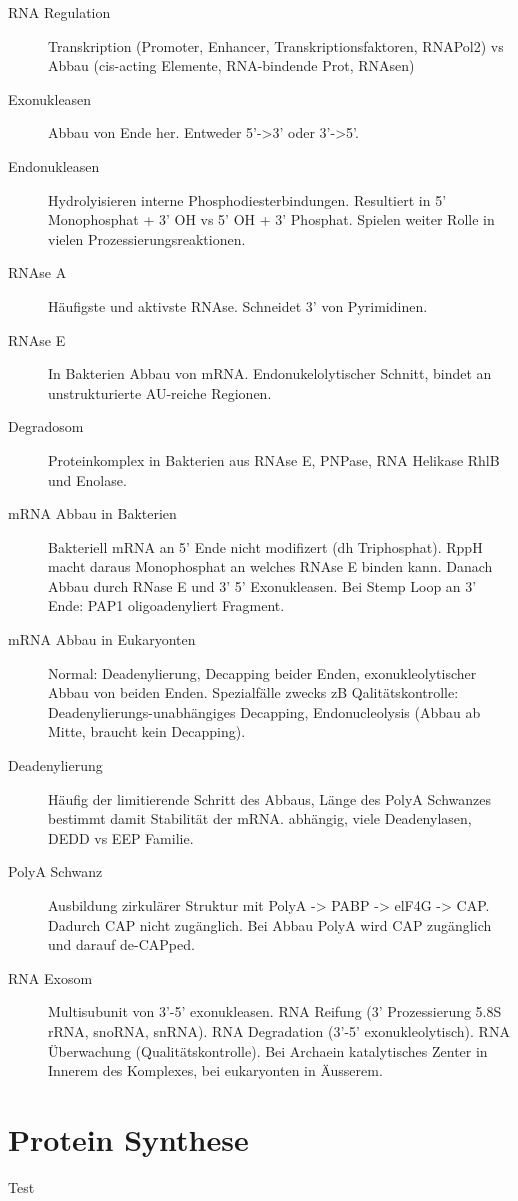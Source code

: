 \documentclass[a4paper,twocolumn,usegeometry,english,fontsize=6,DIV=16]{scrartcl}
\begin{document}
\begin{description}
	\item[RNA Regulation] Transkription (Promoter, Enhancer,
		Transkriptionsfaktoren, RNAPol2) vs Abbau (cis-acting Elemente,
		RNA-bindende Prot, RNAsen)
	\item[Exonukleasen] Abbau von Ende her. Entweder 5'->3' oder 3'->5'.
	\item[Endonukleasen] Hydrolyisieren interne Phosphodiesterbindungen.
		Resultiert in 5' Monophosphat + 3' OH vs 5' OH + 3' Phosphat.
		Spielen weiter Rolle in vielen Prozessierungsreaktionen.
	\item[RNAse A] Häufigste und aktivste RNAse. Schneidet 3' von
		Pyrimidinen.
	\item[RNAse E] In Bakterien Abbau von mRNA. Endonukelolytischer
		Schnitt, bindet an unstrukturierte AU-reiche Regionen.
	\item[Degradosom] Proteinkomplex in Bakterien aus RNAse E, PNPase, RNA
		Helikase RhlB und Enolase.
	\item[mRNA Abbau in Bakterien] Bakteriell mRNA an 5' Ende nicht
		modifizert (dh Triphosphat). RppH macht daraus Monophosphat an
		welches RNAse E binden kann. Danach Abbau durch RNase E und 3'
		5' Exonukleasen. Bei Stemp Loop an 3' Ende: PAP1
		oligoadenyliert Fragment.
	\item[mRNA Abbau in Eukaryonten] Normal: Deadenylierung, Decapping
		beider Enden, exonukleolytischer Abbau von beiden Enden.
		Spezialfälle zwecks zB Qalitätskontrolle:
		Deadenylierungs-unabhängiges Decapping, Endonucleolysis (Abbau
		ab Mitte, braucht kein Decapping).
	\item[Deadenylierung] Häufig der limitierende Schritt des Abbaus, Länge
		des PolyA Schwanzes bestimmt damit Stabilität der mRNA.
		 abhängig, viele Deadenylasen, DEDD vs EEP Familie.
	\item[PolyA Schwanz] Ausbildung zirkulärer Struktur mit PolyA -> PABP
		-> elF4G -> CAP. Dadurch CAP nicht zugänglich. Bei Abbau PolyA
		wird CAP zugänglich und darauf de-CAPped.
	\item[RNA Exosom] Multisubunit von 3'-5' exonukleasen. RNA Reifung (3'
		Prozessierung 5.8S rRNA, snoRNA, snRNA). RNA Degradation (3'-5'
		exonukleolytisch). RNA Überwachung (Qualitätskontrolle). Bei
		Archaein katalytisches Zenter in Innerem des Komplexes, bei
		eukaryonten in Äusserem.

\end{description}

\section{Protein Synthese}
Test
\end{document}
